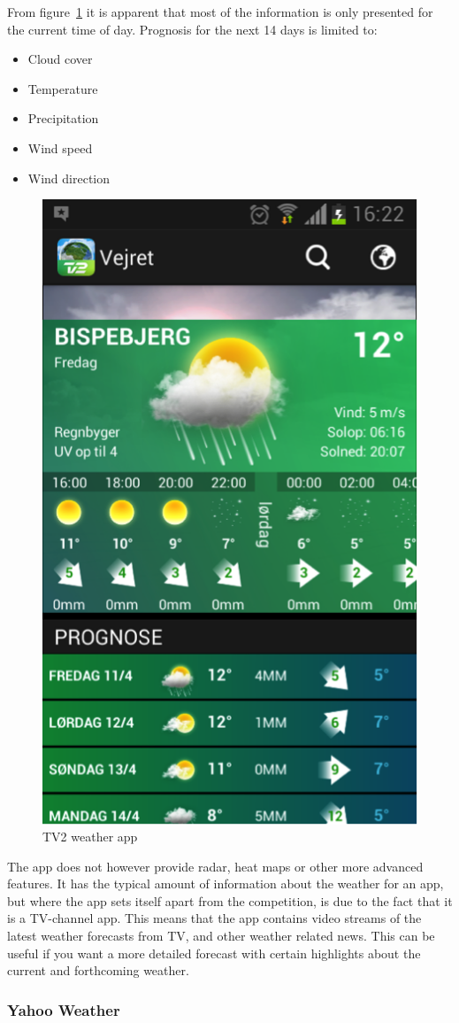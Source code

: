 From figure~\ref{fig:tv21} it is apparent that most of the information is only presented for the current time of day. 
Prognosis for the next 14 days is limited to:

\begin{itemize}
    \item Cloud cover
    \item Temperature
    \item Precipitation
    \item Wind speed
    \item Wind direction
\end{itemize}

\begin{figure}[!htbp]
    \centering
    \includegraphics[width=.4\textwidth]{images/Tv21.png}
    \caption{TV2 weather app}
    \label{fig:tv21}
\end{figure}

The app does not however provide radar, heat maps or other more advanced features. 
It has the typical amount of information about the weather for an app, but where the app sets itself apart from the competition, is due to the fact that it is a TV-channel app. 
This means that the app contains video streams of the latest weather forecasts from TV, and other weather related news. 
This can be useful if you want a more detailed forecast with certain highlights about the current and forthcoming weather. 


\FloatBarrier
\subsubsection*{Yahoo Weather} %
\label{ssub:yahoo_weather}

